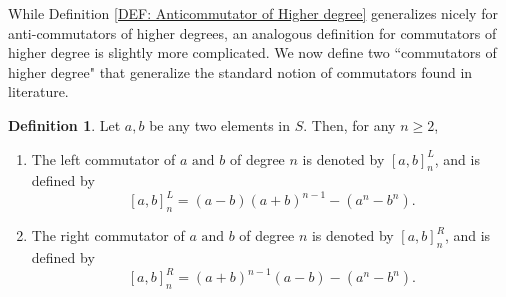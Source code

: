 \documentclass[12pt]{amsart}
\theoremstyle{definition}
\newtheorem{definition}[theorem]{Definition}
\numberwithin{equation}{section}
\begin{document}
While Definition \ref{DEF: Anticommutator of Higher degree} generalizes nicely for anti-commutators of higher degrees, an analogous definition for commutators of higher degree is slightly more complicated. We now define two ``commutators of higher degree" that generalize the standard notion of commutators found in literature.
\begin{definition}\label{DEF: commutators of higher degree}  Let $a,b $ be any two elements in $S$.  Then, for any $n \geq 2$,
    \begin{enumerate}
       \item The left commutator of $a\text{ and }b$ of degree $n$ is denoted by $[a,b]_n^L$, and is defined by
    $$[a,b]_n^L =(a-b)(a+b)^{n-1}-(a^n-b^n).$$
       \item The right commutator of $a\text{ and }b$ of degree $n$ is denoted by $[a,b]_n^R$, and is defined by
  $$[a,b]_n^R =(a+b)^{n-1}(a-b)-(a^n-b^n).$$
         
    \end{enumerate}
\end{definition}
\end{document}
